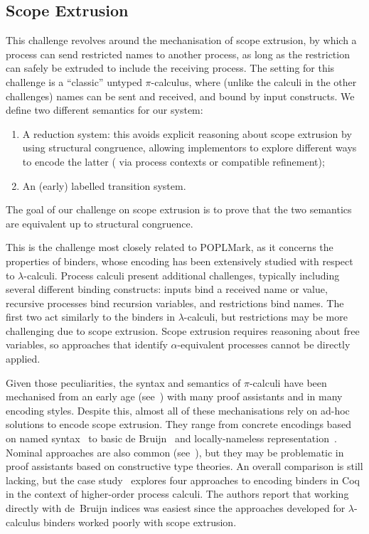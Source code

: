 \documentclass[runningheads]{llncs}
\begin{document}
\subsection{Scope Extrusion}
This challenge revolves around the mechanisation of scope
extrusion, by which a process can send restricted names to another
process, as long as the restriction can safely be extruded to include
the receiving process.  The setting for this challenge is a
``classic'' untyped \( \pi \)-calculus, where (unlike the calculi in
the other challenges) names can be sent and received, and bound by
input constructs.  We define two different semantics for our system:
\begin{enumerate}
\item A reduction system: this avoids explicit reasoning about scope
  extrusion by using structural congruence, allowing
  implementors to explore different ways to encode the latter (\eg
  via process contexts or compatible refinement);
\item An (early) labelled transition system.
\end{enumerate}
The goal of our challenge on scope extrusion is to prove that the two semantics are
equivalent up to structural congruence.

This is the challenge most closely related to POPLMark,
as it concerns the properties of binders, whose encoding has been
extensively studied with respect to $\lambda$-calculi. Process calculi
present additional challenges, typically including several
different binding constructs: inputs bind a received name or value,
recursive processes bind recursion variables, and restrictions bind
names. The first two act similarly to the binders in
$\lambda$-calculi, but restrictions may be more challenging due to
scope extrusion.
Scope extrusion requires reasoning about free variables, so approaches that identify \(\alpha\)-equivalent processes cannot be directly applied.

Given those peculiarities, the syntax and semantics of $\pi$-calculi
have been mechanised from an early age (see~\cite{Melham1994}) with
many proof assistants and in many encoding styles.  Despite this,
almost all of these mechanisations rely on ad-hoc solutions to encode
scope extrusion.  They range from concrete encodings based on named
syntax~\cite{Melham1994} to basic de Bruijn~\cite{Hirschkoff1997,
  Perera2018} and locally-nameless representation~\cite{Castro2020}.
Nominal approaches are also common (see~\cite{Bengtson2009}), but they
may be problematic in proof assistants based on constructive type
theories.  An overall comparison is still lacking, but the case
study~\cite{AmbalLS21} explores four approaches to encoding binders in
Coq in the context of higher-order process calculi.  The authors report that working directly
with de~Bruijn indices was easiest since the approaches
developed for $\lambda$-calculus binders worked poorly with scope
extrusion.
\end{document}
